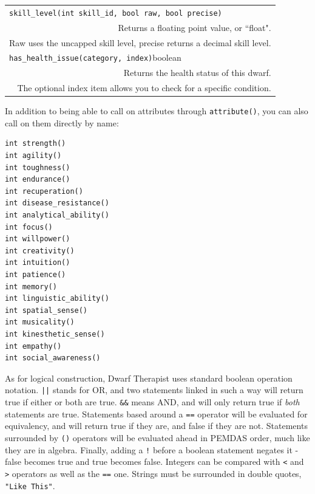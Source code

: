 \documentclass[]{article}
\begin{document}
\begin{tabular}{l c l}
\multicolumn{3}{l}{\texttt{skill\_level(int skill\_id, bool raw, bool precise)}}\\
\multicolumn{3}{r}{Returns a floating point value, or ``float".}\\
\multicolumn{3}{r}{Raw uses the uncapped skill level, precise returns a decimal skill level.}\\
\multicolumn{3}{l}{\texttt{has\_health\_issue(category, index)}\quad boolean}\\
\multicolumn{3}{r}{Returns the health status of this dwarf.}\\
\multicolumn{3}{r}{The optional index item allows you to check for a specific condition.}\\
\end{tabular}
\vspace{12pt}

\noindent In addition to being able to call on attributes through \texttt{attribute()}, you can also call
on them directly by name:
\begin{multicols}{3}

\begin{verbatim}
int strength()
int agility()
int toughness()
int endurance()
int recuperation()
int disease_resistance()
int analytical_ability()
int focus()
int willpower()
int creativity()
int intuition()
int patience()
int memory()
int linguistic_ability()
int spatial_sense()
int musicality()
int kinesthetic_sense()
int empathy()
int social_awareness()
\end{verbatim}
\end{multicols}

As for logical construction, Dwarf Therapist uses standard boolean operation notation. \texttt{||} stands
for OR, and two statements linked in such a way will return true if either or both are true.
\texttt{\&\&} means AND, and will only return true if \emph{both} statements are true. Statements based
around a \texttt{==} operator will be evaluated for equivalency, and will return true if they are, and
false if they are not. Statements surrounded by \texttt{()} operators will be evaluated ahead in PEMDAS
order, much like they are in algebra. Finally, adding a \texttt{!} before a boolean statement negates it
- false becomes true and true becomes false. Integers can be compared with \texttt{<} and \texttt{>}
operators as well as the \texttt{==} one. Strings must be surrounded in double quotes, \texttt{"Like
This"}.
\end{document}
